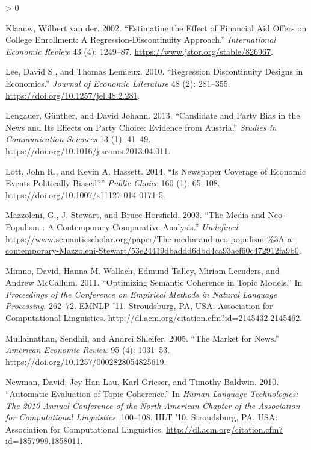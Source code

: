 \documentclass[
  12pt,
]{article}
\newlength{\cslhangindent}
\newenvironment{CSLReferences}[2] %
 {%
  \setlength{\parindent}{0pt}
  \ifodd #1 \everypar{\setlength{\hangindent}{\cslhangindent}}\ignorespaces\fi
  \ifnum #2 > 0
  \setlength{\parskip}{#2\baselineskip}
  \fi
 }%
 {}
\begin{document}
\begin{CSLReferences}{1}{0}
\leavevmode\hypertarget{ref-van_der_klaauw_estimating_2002}{}%
Klaauw, Wilbert van der. 2002. {``Estimating the Effect of Financial Aid
Offers on College Enrollment: A Regression-Discontinuity Approach.''}
\emph{International Economic Review} 43 (4): 1249--87.
\url{https://www.jstor.org/stable/826967}.

\leavevmode\hypertarget{ref-lee_regression_2010}{}%
Lee, David S., and Thomas Lemieux. 2010. {``Regression Discontinuity
Designs in Economics.''} \emph{Journal of Economic Literature} 48 (2):
281--355. \url{https://doi.org/10.1257/jel.48.2.281}.

\leavevmode\hypertarget{ref-lengauer_candidate_2013}{}%
Lengauer, Günther, and David Johann. 2013. {``Candidate and Party Bias
in the News and Its Effects on Party Choice: Evidence from Austria.''}
\emph{Studies in Communication Sciences} 13 (1): 41--49.
\url{https://doi.org/10.1016/j.scoms.2013.04.011}.

\leavevmode\hypertarget{ref-lott_is_2014}{}%
Lott, John R., and Kevin A. Hassett. 2014. {``Is Newspaper Coverage of
Economic Events Politically Biased?''} \emph{Public Choice} 160 (1):
65--108. \url{https://doi.org/10.1007/s11127-014-0171-5}.

\leavevmode\hypertarget{ref-mazzoleni_media_2003}{}%
Mazzoleni, G., J. Stewart, and Bruce Horsfield. 2003. {``The Media and
Neo-Populism : A Contemporary Comparative Analysis.''} \emph{Undefined}.
\url{https://www.semanticscholar.org/paper/The-media-and-neo-populism-\%3A-a-contemporary-Mazzoleni-Stewart/53e24419dbaddd6dbd4ca93aef60c472912fa9b0}.

\leavevmode\hypertarget{ref-mimno_optimizing_2011}{}%
Mimno, David, Hanna M. Wallach, Edmund Talley, Miriam Leenders, and
Andrew McCallum. 2011. {``Optimizing Semantic Coherence in Topic
Models.''} In \emph{Proceedings of the Conference on Empirical Methods
in Natural Language Processing}, 262--72. {EMNLP} '11. Stroudsburg,
{PA}, {USA}: Association for Computational Linguistics.
\url{http://dl.acm.org/citation.cfm?id=2145432.2145462}.

\leavevmode\hypertarget{ref-mullainathan_market_2005}{}%
Mullainathan, Sendhil, and Andrei Shleifer. 2005. {``The Market for
News.''} \emph{American Economic Review} 95 (4): 1031--53.
\url{https://doi.org/10.1257/0002828054825619}.

\leavevmode\hypertarget{ref-newman_automatic_2010}{}%
Newman, David, Jey Han Lau, Karl Grieser, and Timothy Baldwin. 2010.
{``Automatic Evaluation of Topic Coherence.''} In \emph{Human Language
Technologies: The 2010 Annual Conference of the North American Chapter
of the Association for Computational Linguistics}, 100--108. {HLT} '10.
Stroudsburg, {PA}, {USA}: Association for Computational Linguistics.
\url{http://dl.acm.org/citation.cfm?id=1857999.1858011}.


\end{CSLReferences}
\end{document}
